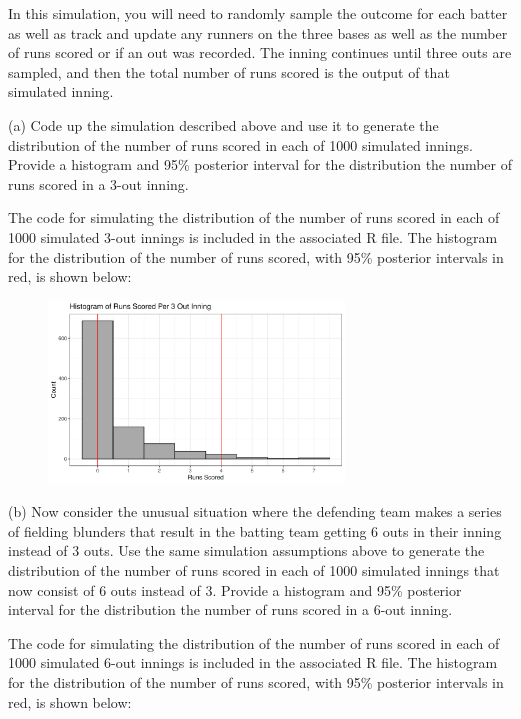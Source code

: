 \documentclass[12pt]{article}
\begin{document}
In this simulation, you will need to randomly sample the outcome for each batter as well as track and update any runners on the three bases as well as the number of runs scored or if an out was recorded.  The inning continues until three outs are sampled, and then the total number of runs scored is the output of that simulated inning.

(a) Code up the simulation described above and use it to generate the distribution of the number of runs scored in each of 1000 simulated innings.  Provide a histogram and 95\% posterior interval for the distribution the number of runs scored in a 3-out inning.  

The code for simulating the distribution of the number of runs scored in each of 1000 simulated 3-out innings
is included in the associated R file. The histogram for the distribution of the number of runs scored,
with 95\% posterior intervals in red, is shown below:

\begin{figure}[h]
    \centering
    \includegraphics[width=0.7\textwidth]{q8a_plot.pdf}
\end{figure}

(b) Now consider the unusual situation where the defending team makes a series of fielding blunders that result in the batting team getting 6 outs in their inning instead of 3 outs.  Use the same simulation assumptions above to generate the distribution of the number of runs scored in each of 1000 simulated innings that now consist of 6 outs instead of 3.   Provide a histogram and 95\% posterior interval for the distribution the number of runs scored in a 6-out inning.  

The code for simulating the distribution of the number of runs scored in each of 1000 simulated 6-out innings
is included in the associated R file. The histogram for the distribution of the number of runs scored,
with 95\% posterior intervals in red, is shown below:
\end{document}
